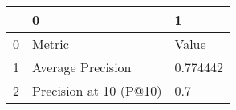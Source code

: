 \begin{tabular}{lll}
\toprule
{} &                       0 &         1 \\
\midrule
0 &                  Metric &     Value \\
1 &       Average Precision &  0.774442 \\
2 &  Precision at 10 (P@10) &       0.7 \\
\bottomrule
\end{tabular}
